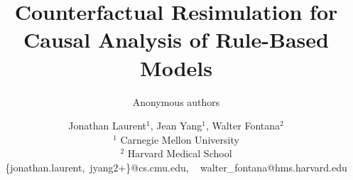 \documentclass{article}
\title{
  \setstretch{1.15}
  Counterfactual Resimulation for Causal Analysis of
  Rule-Based Models
}
\author{Anonymous authors}
\author{
  Jonathan Laurent$^1$,
  Jean Yang$^1$,
  Walter Fontana$^2$ \\
  $^1$ Carnegie Mellon University \\
  $^2$ Harvard Medical School \\
  \{jonathan.laurent,\ jyang2+\}@cs.cmu.edu, \ 
  walter\_fontana@hms.harvard.edu
}
\newif\ifreview
\newif\ifincludeappendices
\begin{document}
\maketitle








\ifreview
\else

\fi

\ifincludeappendices

\fi


\nocite{Halpern2005}


\end{document}
